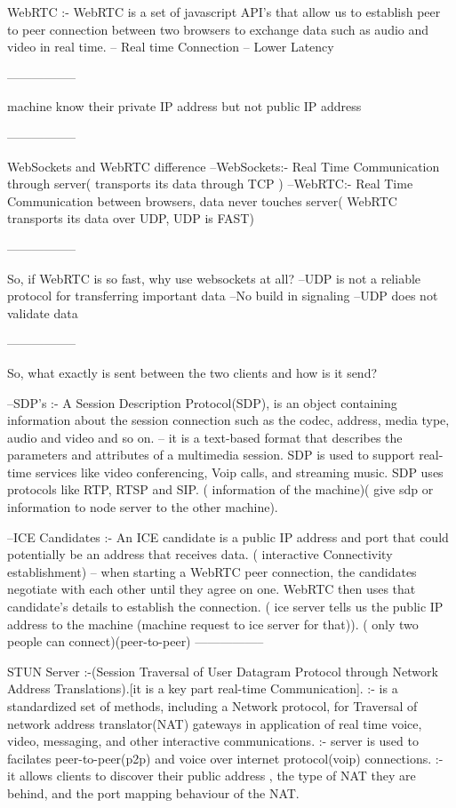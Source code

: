 WebRTC :- WebRTC is a set of javascript API's that allow us to establish peer to peer connection between two browsers to exchange data such as audio and video in real time.
 -- Real time Connection
 -- Lower Latency

-----------------

machine know their private IP address but not public IP address

-----------------

WebSockets and WebRTC difference
 --WebSockets:- Real Time Communication through server( transports its data through TCP )
 --WebRTC:- Real Time Communication between browsers, data never touches server( WebRTC transports its data over UDP, UDP is FAST)

 -----------------

So, if WebRTC is so fast, why use websockets at all?
 --UDP is not a reliable protocol for transferring important data
 --No build in signaling
 --UDP does not  validate data

 -----------------

So, what exactly is sent between the two clients and how is it send?

 --SDP's :- A Session Description Protocol(SDP), is an object containing information about the session connection such as the codec, address, media type, audio and video and so on.
            -- it is a text-based format that describes  the parameters and attributes of a multimedia session. SDP is used to support real-time services like video conferencing, Voip calls, and streaming  music. SDP uses protocols like RTP, RTSP and SIP.
               ( information of the machine)( give sdp or information to node server to the other machine).   

 --ICE Candidates :- An ICE candidate is a public IP address and port that could potentially be an address that receives data.   ( interactive Connectivity establishment)
                     -- when starting a WebRTC peer connection, the candidates negotiate with each other until they agree on one. WebRTC then uses that candidate's details to establish the connection.
                     ( ice server tells us the public IP address to the machine (machine request to ice server for that)).
                     ( only two people can connect)(peer-to-peer)
-----------------

STUN Server :-(Session Traversal of User Datagram Protocol through Network Address Translations).[it is a key part real-time Communication]. 
            :- is a standardized set of methods, including a Network protocol, for Traversal of network address translator(NAT) gateways in application of real time voice, video, messaging, and other interactive communications.
            :- server is used to facilates peer-to-peer(p2p) and voice over internet protocol(voip) connections.
            :- it allows clients to discover their public address , the type of NAT they are behind, and the port mapping behaviour of the NAT.
            
